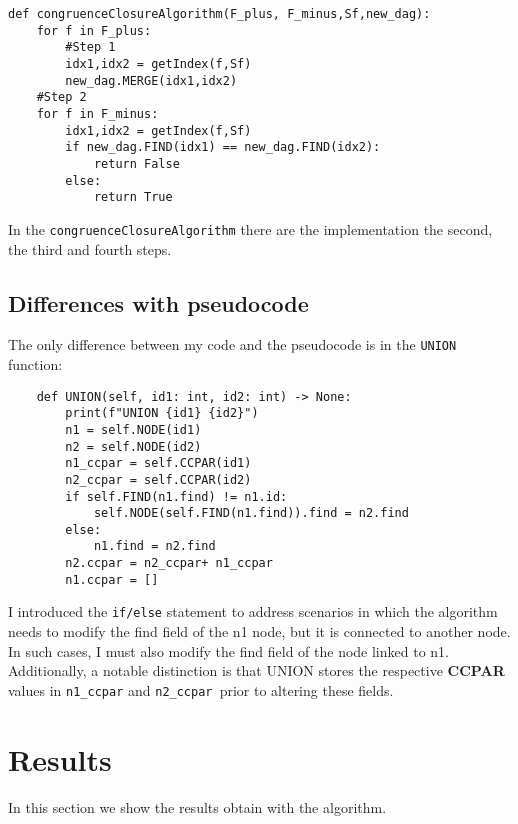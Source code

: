 \documentclass{article}
\begin{document}
\begin{lstlisting}
def congruenceClosureAlgorithm(F_plus, F_minus,Sf,new_dag):
    for f in F_plus:
        #Step 1
        idx1,idx2 = getIndex(f,Sf)
        new_dag.MERGE(idx1,idx2)
    #Step 2
    for f in F_minus:
        idx1,idx2 = getIndex(f,Sf)
        if new_dag.FIND(idx1) == new_dag.FIND(idx2):
            return False
        else:
            return True
\end{lstlisting}


In the \texttt{congruenceClosureAlgorithm} there are the implementation the second, the third and fourth steps.


\subsection{Differences with pseudocode}

The only difference between my code and the pseudocode is in the \texttt{UNION} function:
\begin{lstlisting}
    def UNION(self, id1: int, id2: int) -> None:
        print(f"UNION {id1} {id2}")
        n1 = self.NODE(id1)
        n2 = self.NODE(id2)
        n1_ccpar = self.CCPAR(id1)
        n2_ccpar = self.CCPAR(id2)
        if self.FIND(n1.find) != n1.id:
            self.NODE(self.FIND(n1.find)).find = n2.find
        else:
            n1.find = n2.find
        n2.ccpar = n2_ccpar+ n1_ccpar
        n1.ccpar = []
\end{lstlisting}
I introduced the \texttt{if/else} statement to address scenarios in which the algorithm needs to modify the find field of the n1 node, but it is connected to another node. In such cases, I must also modify the find field of the node linked to n1. Additionally, a notable distinction is that UNION stores the respective \textbf{CCPAR} values in \texttt{n1\_ccpar} and \texttt{n2\_ccpar }prior to altering these fields.

\section{Results}

In this section we show the results obtain with the algorithm.
\end{document}
